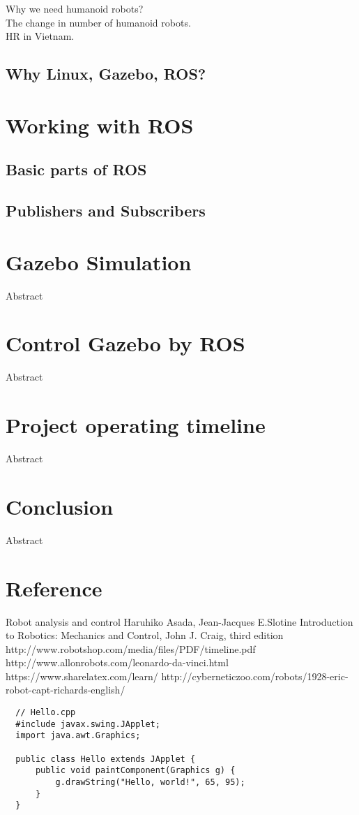 \documentclass[pdftex,12pt,a4paper]{article}
\begin{document}
  Why we need humanoid robots? \\
  The change in number of humanoid robots. \\
  HR in Vietnam. \\
  \subsection{Why Linux, Gazebo, ROS?}
  
  \newpage
  \section{Working with ROS}
  \subsection{Basic parts of ROS}
  
  \newpage
  \subsection{Publishers and Subscribers}
  
  \newpage
  \section{Gazebo Simulation}
  Abstract
  
  \newpage
  \section{Control Gazebo by ROS}
  Abstract

  \newpage
  \section{Project operating timeline}
  Abstract
  
  \newpage
  \section{Conclusion}
  Abstract
  
  \newpage
  \section{Reference}
  Robot analysis and control Haruhiko Asada, Jean-Jacques E.Slotine
  Introduction to Robotics: Mechanics and Control, John J. Craig, third edition
  http://www.robotshop.com/media/files/PDF/timeline.pdf
  http://www.allonrobots.com/leonardo-da-vinci.html
  https://www.sharelatex.com/learn/
  http://cyberneticzoo.com/robots/1928-eric-robot-capt-richards-english/
  \begin{lstlisting}
  // Hello.cpp
  #include javax.swing.JApplet;
  import java.awt.Graphics;
  
  public class Hello extends JApplet {
	  public void paintComponent(Graphics g) {
          g.drawString("Hello, world!", 65, 95);
      }    
  }
  \end{lstlisting}
  
\end{document}
